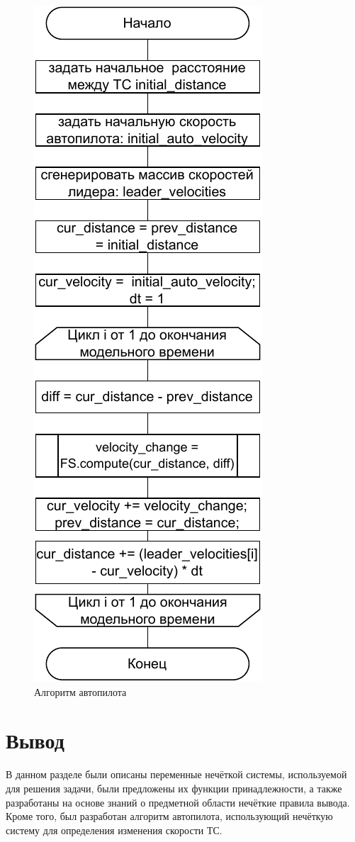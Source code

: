 \documentclass[12pt]{report}
\begin{document}
\begin{figure}[h!]
  \centering
  \includegraphics[scale = 0.9]{algo.pdf}
  \caption{Алгоритм автопилота}
  \label{fig:algo}
\end{figure}

\section*{Вывод}
В данном разделе были описаны переменные нечёткой системы, используемой для решения задачи, были предложены их функции принадлежности, а также разработаны на основе знаний о предметной области нечёткие правила вывода. 
Кроме того, был разработан алгоритм автопилота, использующий нечёткую систему для определения изменения скорости ТС.
\end{document}
